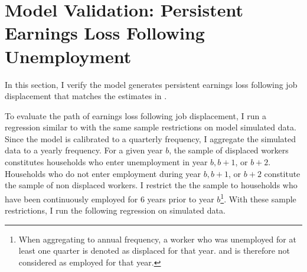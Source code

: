 \begin{center}
\begin{table}[H]
\renewcommand{\arraystretch}{1.6}
\caption{Rest of Economy Calibration}\label{table:Calibration}
\end{table}
\end{center}



\section{Model Validation: Persistent Earnings Loss Following Unemployment}

In this section, I verify the model generates persistent earnings loss following job displacement that matches the estimates in \cite{DavisVonWachter2011}. 

To evaluate the path of earnings loss following job displacement, I run a regression similar to \cite{DavisVonWachter2011} with the same sample restrictions on model simulated data. Since the model is calibrated to a quarterly frequency, I aggregate the simulated data to a yearly frequency. For a given year $b$, the sample of displaced workers constitutes households who enter unemployment in year $b, b+1$, or $b+2$.  Households who do not enter employment during year $b, b+1$, or $b+2$ constitute the sample of non displaced workers. I restrict the the sample to households who have been continuously employed for 6 years prior to year $b$\footnote{When aggregating to annual frequency, a worker who was unemployed  for at least one quarter is denoted as displaced for that year. and is therefore not considered as employed for that year.}. With these sample restrictions, I run the following regression on simulated data.


